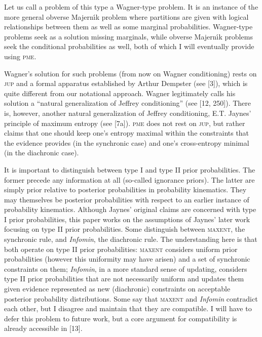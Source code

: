 \documentclass[entropy,article,submit,oneauthor,pdftex,12pt,a4paper]{mdpi}
\newcommand{\qeins}[1]{``#1''}
\begin{document}
Let us call a problem of this type a Wagner-type problem. It is an
instance of the more general obverse Majern{\'\i}k problem where partitions
are given with logical relationships between them as well as some
marginal probabilities. Wagner-type problems seek as a solution
missing marginals, while obverse Majern{\'\i}k problems seek the
conditional probabilities as well, both of which I will eventually
provide using \textsc{pme}.

Wagner's solution for such problems (from now on Wagner conditioning)
rests on \textsc{jup} and a formal apparatus established by Arthur
Dempster (see [3]), which is quite different from our notational
approach. Wagner legitimately calls his solution a \qeins{natural
  generalization of Jeffrey conditioning} (see [12, 250]). There is,
however, another natural generalization of Jeffrey conditioning, E.T.
Jaynes' principle of maximum entropy (see [7a]). \textsc{pme} does not
rest on \textsc{jup}, but rather claims that one should keep one's
entropy maximal within the constraints that the evidence provides (in
the synchronic case) and one's cross-entropy minimal (in the
diachronic case). 

It is important to distinguish between type I and type II prior
probabilities. The former precede any information at all (so-called
ignorance priors). The latter are simply prior relative to posterior
probabilities in probability kinematics. They may themselves be
posterior probabilities with respect to an earlier instance of
probability kinematics. Although Jaynes' original claims are concerned
with type I prior probabilities, this paper works on the assumptions
of Jaynes' later work focusing on type II prior probabilities. Some
distinguish between \textsc{maxent}, the synchronic rule, and
\emph{Infomin}, the diachronic rule. The understanding here is that
both operate on type II prior probabilities: \textsc{maxent} considers
uniform prior probabilities (however this uniformity may have arisen)
and a set of synchronic constraints on them; \emph{Infomin}, in a more
standard sense of updating, considers type II prior probabilities that
are not necessarily uniform and updates them given evidence
represented as new (diachronic) constraints on acceptable posterior
probability distributions. Some say that \textsc{maxent} and
\emph{Infomin} contradict each other, but I disagree and maintain that
they are compatible. I will have to defer this problem to future work,
but a core argument for compatibility is already accessible in [13].
\end{document}
